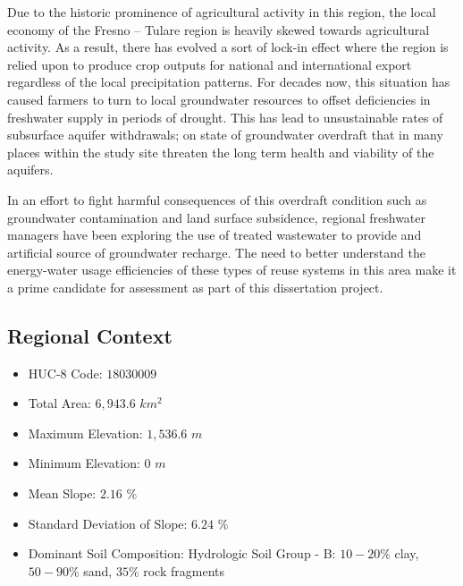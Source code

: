 Due to the historic prominence of agricultural activity in this region, the local economy of the Fresno -- Tulare region is heavily skewed towards agricultural activity. As a result, there has evolved a sort of lock-in effect where the region is relied upon to produce crop outputs for national and international export regardless of the local precipitation patterns. For decades now, this situation has caused farmers to turn to local groundwater resources to offset deficiencies in freshwater supply in periods of drought. This has lead to unsustainable rates of subsurface aquifer withdrawals; on state of groundwater overdraft that in many places within the study site threaten the long term health and viability of the aquifers. 

In an effort to fight harmful consequences of this overdraft condition such as groundwater contamination and land surface subsidence, regional freshwater managers have been exploring the use of treated wastewater to provide and artificial source of groundwater recharge. The need to better understand the energy-water usage efficiencies of these types of reuse systems in this area make it a prime candidate for assessment as part of this dissertation project.  

    \subsection{Regional Context}

    \begin{itemize}
      \setlength{\itemsep}{0cm}
      \setlength{\parskip}{0cm}
        \item HUC-8 Code: $18030009$
        \item Total Area: $6,943.6$ $km^2$
        \item Maximum Elevation: $1,536.6$ $m$
        \item Minimum Elevation: $0$ $m$
        \item Mean Slope: $2.16$ $\%$
        \item Standard Deviation of Slope: $6.24$ $\%$
        \item Dominant Soil Composition: Hydrologic Soil Group - B: $10-20\%$ clay, $50-90\%$ sand, $35\%$ rock fragments
    \end{itemize}

